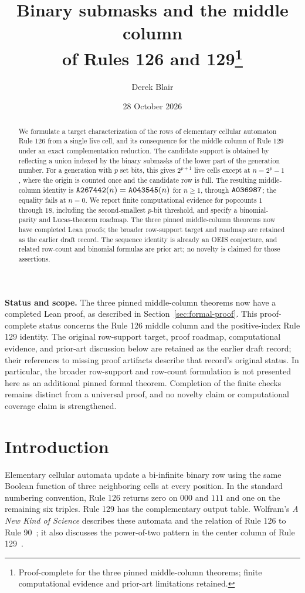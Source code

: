 \documentclass[11pt]{article}
\title{Binary submasks and the middle column\protect\\
of Rules 126 and 129\thanks{Proof-complete for the three pinned middle-column theorems;
finite computational evidence and prior-art limitations retained.}}
\author{Derek Blair}
\date{28 October 2026}
\newcommand{\seq}[1]{\text{\texttt{#1}}}
\begin{document}
\maketitle

\begin{abstract}
We formulate a target characterization of the rows of elementary cellular
automaton Rule 126 from a single live cell, and its consequence for the middle
column of Rule 129 under an exact complementation reduction. The candidate
support is obtained by reflecting a union indexed by the binary submasks of
the lower part of the generation number. For a generation with $p$ set bits,
this gives $2^{p+1}$ live cells except at $n=2^p-1$, where the origin is
counted once and the candidate row is full. The resulting middle-column
identity is $\seq{A267442}(n)=\seq{A043545}(n)$ for $n\geq1$, through
$\seq{A036987}$; the equality fails at $n=0$. We report finite computational
evidence for popcounts $1$ through $18$, including the second-smallest
$p$-bit threshold, and specify a binomial-parity and Lucas-theorem roadmap.
The three pinned middle-column theorems now have completed Lean proofs;
the broader row-support target and roadmap are retained as the earlier
draft record. The sequence identity is already an OEIS conjecture, and related
row-count and binomial formulas are prior art; no novelty is claimed for
those assertions.
\end{abstract}

\noindent\textbf{Status and scope.}
The three pinned middle-column theorems now have a completed Lean proof,
as described in Section~\ref{sec:formal-proof}. This proof-complete status
concerns the Rule 126 middle column and the positive-index Rule 129
identity. The original row-support target, proof roadmap, computational
evidence, and prior-art discussion below are retained as the earlier
draft record; their references to missing proof artifacts describe that
record's original status. In particular, the broader row-support and
row-count formulation is not presented here as an additional pinned
formal theorem. Completion of the finite checks remains distinct from
a universal proof, and no novelty claim or computational coverage
claim is strengthened.

\section{Introduction}

Elementary cellular automata update a bi-infinite binary row using the same
Boolean function of three neighboring cells at every position. In the
standard numbering convention, Rule 126 returns zero on $000$ and $111$ and
one on the remaining six triples. Rule 129 has the complementary output
table. Wolfram's \emph{A New Kind of Science} describes these automata and
the relation of Rule 126 to Rule 90~\cite{wolfram126}; it also discusses the
power-of-two pattern in the center column of Rule 129~\cite{wolfram129}.
\end{document}
